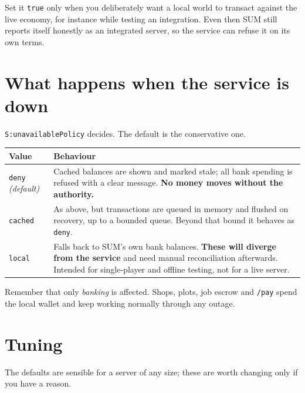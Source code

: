\documentclass[11pt,a4paper]{article}
\newcommand{\code}[1]{\texttt{\small #1}}
\begin{document}
Set it \code{true} only when you deliberately want a local world to transact against the live
economy, for instance while testing an integration. Even then SUM still reports itself honestly as
an integrated server, so the service can refuse it on its own terms.

\section{What happens when the service is down}

\code{S:unavailablePolicy} decides. The default is the conservative one.

\begin{tabularx}{\linewidth}{L{2.4cm} X}
\toprule
\textbf{Value} & \textbf{Behaviour}\\
\midrule
\code{deny} \emph{(default)} & Cached balances are shown and marked stale; all bank spending is
  refused with a clear message. \textbf{No money moves without the authority.}\\
\code{cached} & As above, but transactions are queued in memory and flushed on recovery, up to a
  bounded queue. Beyond that bound it behaves as \code{deny}.\\
\code{local}  & Falls back to SUM's own bank balances. \textbf{These will diverge from the service}
  and need manual reconciliation afterwards. Intended for single-player and offline testing, not
  for a live server.\\
\bottomrule
\end{tabularx}

Remember that only \emph{banking} is affected. Shops, plots, job escrow and \code{/pay} spend the
local wallet and keep working normally through any outage.

\section{Tuning}

The defaults are sensible for a server of any size; these are worth changing only if you have a
reason.
\end{document}

